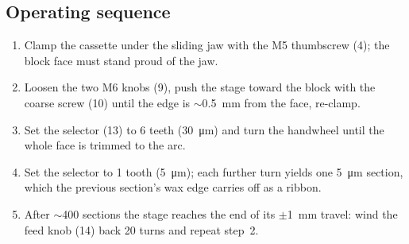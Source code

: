 \subsection{Operating sequence}
\begin{enumerate}[nosep,leftmargin=*]
\item Clamp the cassette under the sliding jaw with the M5 thumbscrew (4); the block face must stand proud of the jaw.
\item Loosen the two M6 knobs (9), push the stage toward the block with the coarse screw (10) until the edge is $\sim$\SI{0.5}{\milli\metre} from the face, re-clamp.
\item Set the selector (13) to 6 teeth (\SI{30}{\micro\metre}) and turn the handwheel until the whole face is trimmed to the arc.
\item Set the selector to 1 tooth (\SI{5}{\micro\metre}); each further turn yields one \SI{5}{\micro\metre} section, which the previous section's wax edge carries off as a ribbon.
\item After $\sim$400 sections the stage reaches the end of its $\pm$\SI{1}{\milli\metre} travel: wind the feed knob (14) back 20 turns and repeat step~2.
\end{enumerate}

\FloatBarrier
